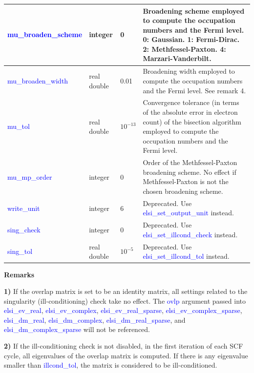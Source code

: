 \documentclass{report}
\begin{document}
\begin{tabular}[]{|p{30mm}|p{20mm}|p{15mm}|p{100mm}|}
\hline
\textcolor{blue}{mu\_broaden\_scheme} & integer     & 0           & Broadening scheme employed to compute the occupation numbers and the Fermi level. 0: Gaussian. 1: Fermi-Dirac. 2: Methfessel-Paxton. 4: Marzari-Vanderbilt.\\
\hline
\textcolor{blue}{mu\_broaden\_width}  & real double & 0.01        & Broadening width employed to compute the occupation numbers and the Fermi level. See remark 4.\\
\hline
\textcolor{blue}{mu\_tol}             & real double & $10^{-13}$  & Convergence tolerance (in terms of the absolute error in electron count) of the bisection algorithm employed to compute the occupation numbers and the Fermi level.\\
\hline
\textcolor{blue}{mu\_mp\_order}       & integer     & 0           & Order of the Methfessel-Paxton broadening scheme. No effect if Methfessel-Paxton is not the chosen broadening scheme.\\
\hline
\textcolor{blue}{write\_unit}         & integer     & 6           & Deprecated. Use \textcolor{blue}{elsi\_set\_output\_unit} instead.\\
\hline
\textcolor{blue}{sing\_check}         & integer     & 0           & Deprecated. Use \textcolor{blue}{elsi\_set\_illcond\_check} instead.\\
\hline
\textcolor{blue}{sing\_tol}           & real double & $10^{-5}$   & Deprecated. Use \textcolor{blue}{elsi\_set\_illcond\_tol} instead.\\
\hline
\end{tabular}

\textbf{Remarks}

\textbf{1)} If the overlap matrix is set to be an identity matrix, all settings related to the singularity (ill-conditioning) check take no effect. The \textcolor{blue}{ovlp} argument passed into \textcolor{blue}{elsi\_ev\_real}, \textcolor{blue}{elsi\_ev\_complex}, \textcolor{blue}{elsi\_ev\_real\_sparse}, \textcolor{blue}{elsi\_ev\_complex\_sparse}, \textcolor{blue}{elsi\_dm\_real}, \textcolor{blue}{elsi\_dm\_complex}, \textcolor{blue}{elsi\_dm\_real\_sparse}, and \textcolor{blue}{elsi\_dm\_complex\_sparse} will not be referenced.

\textbf{2)} If the ill-conditioning check is not disabled, in the first iteration of each SCF cycle, all eigenvalues of the overlap matrix is computed. If there is any eigenvalue smaller than \textcolor{blue}{illcond\_tol}, the matrix is considered to be ill-conditioned.
\end{document}
